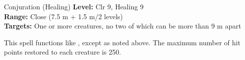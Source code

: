 {Conjuration (Healing)}
{
	\textbf{Level:}
	Clr 9, Healing 9\\
	\textbf{Range:}
	Close (7.5 m + 1.5 m/2 levels)\\
	\textbf{Targets:}
	One or more creatures, no two of which can be more than 9 m apart\\
}
{
	This spell functions like , except as noted above. The maximum number of hit points restored to each creature is 250.

}
